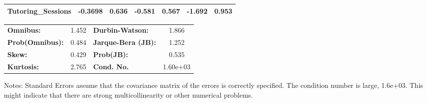 \documentclass[11pt]{article}
\begin{document}
\begin{center}
\begin{tabular}{lcccccc}
\textbf{Tutoring\_Sessions}                         &      -0.3698  &        0.636     &    -0.581  &         0.567        &       -1.692    &        0.953     \\
\bottomrule
\end{tabular}
\begin{tabular}{lclc}
\textbf{Omnibus:}       &  1.452 & \textbf{  Durbin-Watson:     } &    1.866  \\
\textbf{Prob(Omnibus):} &  0.484 & \textbf{  Jarque-Bera (JB):  } &    1.252  \\
\textbf{Skew:}          &  0.429 & \textbf{  Prob(JB):          } &    0.535  \\
\textbf{Kurtosis:}      &  2.765 & \textbf{  Cond. No.          } & 1.60e+03  \\
\bottomrule
\end{tabular}
\end{center}

Notes: \newline
 [1] Standard Errors assume that the covariance matrix of the errors is correctly specified. \newline
 [2] The condition number is large, 1.6e+03. This might indicate that there are \newline
 strong multicollinearity or other numerical problems.

    
\end{document}
